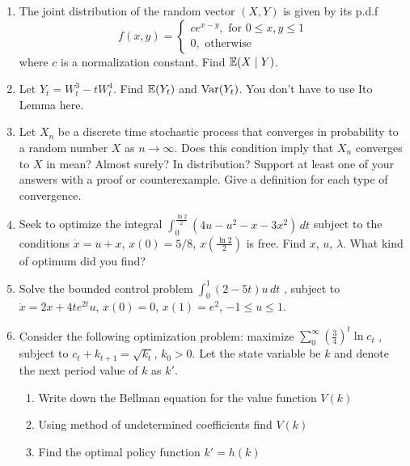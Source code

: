 \documentclass[12pt, a4paper]{article}
\begin{document}
\begin{enumerate}
\item  The joint distribution of the random vector $(X,Y)$ is given by its p.d.f
\[
f(x,y)=
\left\{
  \begin{array}{l}
    c e^{x-y}, \text{ for } 0\leq x,y\leq 1 \\
    0, \text{ otherwise}
  \end{array}
\right.
\]
where $c$ is a normalization constant. Find $\mathbb{E}(X\mid Y)$.

\item Let $Y_t=W_t^3-tW_t^4$. Find $\mathbb{E}(Y_t)$ and $\operatorname{Var}(Y_t)$.  You don’t have to use Ito Lemma here.
\item Let $X_n$ be a discrete time stochastic process that converges in probability to a random number $X$ as $n\to \infty$. Does this condition imply that $X_n$ converges to $X$ in mean? Almost surely? In distribution? Support at least one of your answers with a proof or counterexample. Give a definition for each type of convergence.
\item Seek to optimize the integral
$\int_0^{\frac{\ln 2}{2}} (4u-u^2-x-3x^2)\,dt$
subject to the conditions $\dot{x}=u+x$, $x(0)=5/8$, $x\left(\frac{\ln 2}{2}\right)$ is free. Find $x$, $u$, $\lambda$. What kind of optimum did you find?
\item Solve the bounded control problem
$\int_0^1 (2-5t)u\,dt$
, subject to $\dot{x}=2x+4te^{2t}u$, $x(0)=0$, $x(1)=e^2$, $-1\leq u\leq 1$.
\item Consider the following optimization problem: maximize
$\sum_0^{\infty} \left(\frac{3}{4}\right)^t \ln c_t$
, subject to $c_t+k_{t+1}=\sqrt{k_t}$, $k_0>0$. Let the state variable be $k$ and denote the next period value of $k$ as $k'$.
\begin{enumerate}
\item Write down the Bellman equation for the value function $V(k)$
\item Using method of undetermined coefficients find $V(k)$
\item Find the optimal policy function $k'=h(k)$
\end{enumerate}

\end{enumerate}
\end{document}
